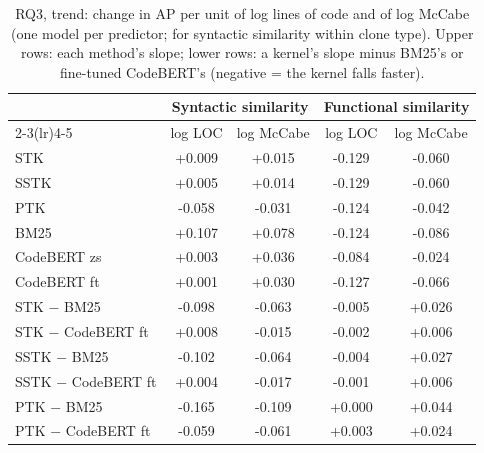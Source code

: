 \begin{table}[!htbp]
\centering
\caption{RQ3, trend: change in AP per unit of log lines of code and of log McCabe (one model per predictor; for syntactic similarity within clone type). Upper rows: each method's slope; lower rows: a kernel's slope minus BM25's or fine-tuned CodeBERT's (negative = the kernel falls faster).}
\label{tab:rq3trend}
\footnotesize
\setlength{\tabcolsep}{4pt}
\begin{tabular}{lcccc}
\toprule
 & \multicolumn{2}{c}{Syntactic similarity} & \multicolumn{2}{c}{Functional similarity} \\
\cmidrule(lr){2-3}\cmidrule(lr){4-5}
 & log LOC & log McCabe & log LOC & log McCabe \\
\midrule
STK & +0.009 & +0.015 & -0.129 & -0.060 \\
SSTK & +0.005 & +0.014 & -0.129 & -0.060 \\
PTK & -0.058 & -0.031 & -0.124 & -0.042 \\
BM25 & +0.107 & +0.078 & -0.124 & -0.086 \\
CodeBERT zs & +0.003 & +0.036 & -0.084 & -0.024 \\
CodeBERT ft & +0.001 & +0.030 & -0.127 & -0.066 \\
\midrule
STK $-$ BM25 & -0.098 & -0.063 & -0.005 & +0.026 \\
STK $-$ CodeBERT ft & +0.008 & -0.015 & -0.002 & +0.006 \\
SSTK $-$ BM25 & -0.102 & -0.064 & -0.004 & +0.027 \\
SSTK $-$ CodeBERT ft & +0.004 & -0.017 & -0.001 & +0.006 \\
PTK $-$ BM25 & -0.165 & -0.109 & +0.000 & +0.044 \\
PTK $-$ CodeBERT ft & -0.059 & -0.061 & +0.003 & +0.024 \\
\bottomrule
\end{tabular}
\end{table}
